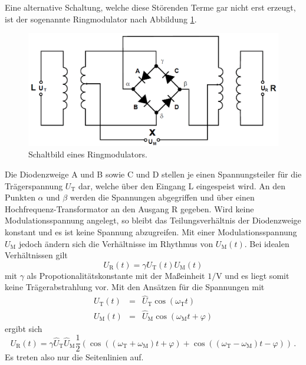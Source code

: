 Eine alternative Schaltung, welche diese Störenden Terme gar nicht erst erzeugt, ist der sogenannte Ringmodulator nach Abbildung \ref{ringmodulator}.

\begin{figure}[!h]
    \centering
    \includegraphics[width = 14cm]{images/ringmodulator.png}
    \caption{Schaltbild eines Ringmodulators.}
    \label{ringmodulator}
\end{figure}

Die Diodenzweige A und B sowie C und D stellen je einen Spannungsteiler für die Trägerspannung $U_\text{T}$ dar, welche über den Eingang L eingespeist wird.
An den Punkten $\alpha$ und $\beta$ werden die Spannungen abgegriffen und über einen Hochfrequenz-Transformator an den Ausgang R gegeben.
Wird keine Modulationsspannung angelegt, so bleibt das Teilungsverhältnis der Diodenzweige konstant und es ist keine Spannung abzugreifen.
Mit einer Modulationsspannung $U_\text{M}$ jedoch ändern sich die Verhältnisse im Rhythmus von $U_\text{M}(t)$.
Bei idealen Verhältnissen gilt
\begin{equation*}
    U_\text{R}(t) = \gamma U_\text{T}(t) U_\text{M}(t)
\end{equation*}
mit $\gamma$ als Propotionalitätskonstante mit der Maßeinheit $\si{1\per\volt}$ und es liegt somit keine Trägerabstrahlung vor.
Mit den Ansätzen für die Spannungen mit 
\begin{eqnarray*}
    U_\text{T}(t) &=& \hat{U}_\text{T} \cos{\left(\omega_\text{T} t\right)} \\
    U_\text{M}(t) &=& \hat{U}_\text{M} \cos{\left(\omega_\text{M} t + \varphi \right)}
\end{eqnarray*}
ergibt sich
\begin{equation*}
    U_\text{R}(t) = \gamma \hat{U}_\text{T} \hat{U}_\text{M} \frac{1}{2} \left( \cos{\left( \left( \omega_\text{T} + \omega_\text{M} \right) t + \varphi \right)} + \cos{\left( \left( \omega_\text{T} - \omega_\text{M} \right) t - \varphi \right)} \right) \,.
\end{equation*}
Es treten also nur die Seitenlinien auf.


